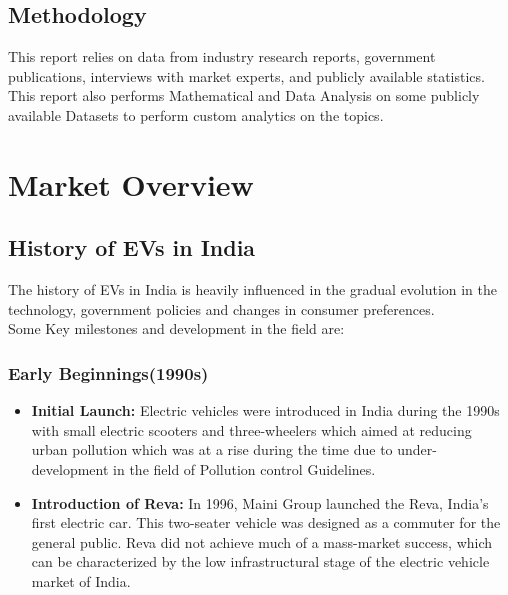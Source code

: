 \documentclass[a4paper,12pt]{report}
\begin{document}
\section{Methodology}
This report relies on data from industry research reports, government publications, interviews with market experts, and publicly available statistics.\\
This report also performs Mathematical and Data Analysis on some publicly available Datasets to perform custom analytics on the topics. 






\chapter{Market Overview}
\section{History of EVs in India}
The history of EVs in India is heavily influenced in the gradual evolution in the technology, government policies and changes in consumer preferences. \\
Some Key milestones and development in the field are: 
\subsection{Early Beginnings(1990s)}
\begin{itemize}
    \item \textbf{Initial Launch:} Electric vehicles were introduced in India during the 1990s with small electric scooters and three-wheelers which aimed at reducing urban pollution which was at a rise during the time due to under-development in the field of Pollution control Guidelines.
    \item \textbf{Introduction of Reva:} In 1996, Maini Group launched the Reva, India's first electric car. This two-seater vehicle was designed as a commuter for the general public. Reva did not achieve much of a mass-market success, which can be characterized by the low infrastructural stage of the electric vehicle market of India.
\end{itemize}
\end{document}
